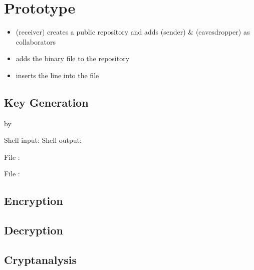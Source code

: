 \section{Prototype}

\begin{itemize}
\item \bob{} (receiver)
  creates a public \github{} repository and
  adds \alice{} (sender) \& \eve{} (eavesdropper)
  as collaborators
\item \bob{} adds the binary file \cryout{}
  to the repository
\item \bob{} inserts the line 
  into the file 
\end{itemize}


\subsection{Key Generation}
by \bob \bigskip

Shell input: \generatekeysindemo
Shell output: \generatekeysoutdemo

File \private{\bobdemo}:
\codestt{}

File \public{\bobdemo}:
\codestt{}


\subsection{Encryption}

\alice
\encryptindemo
\encryptoutdemo


\subsection{Decryption}

\bob
\decryptindemo
\decryptoutdemo


\subsection{Cryptanalysis}

\eve
\cryptanalyzeindemo
\cryptanalyzeoutdemo
